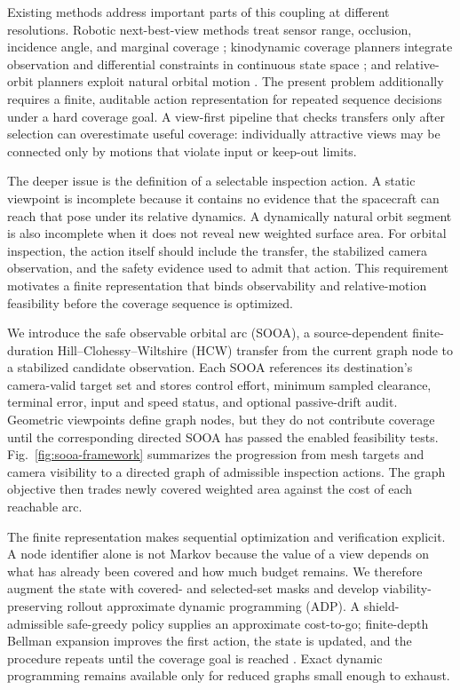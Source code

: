 \documentclass{IEEEtaes}
\theoremstyle{remark}
\theoremstyle{plain}
\begin{document}
Existing methods address important parts of this coupling at different resolutions. Robotic next-best-view methods treat sensor range, occlusion, incidence angle, and marginal coverage \cite{scott2003view}; kinodynamic coverage planners integrate observation and differential constraints in continuous state space \cite{faghihi2022kinodynamic,faghihi2023multiple}; and relative-orbit planners exploit natural orbital motion \cite{hou2024relative,deka2023astrodynamics}. The present problem additionally requires a finite, auditable action representation for repeated sequence decisions under a hard coverage goal. A view-first pipeline that checks transfers only after selection can overestimate useful coverage: individually attractive views may be connected only by motions that violate input or keep-out limits.

The deeper issue is the definition of a selectable inspection action. A static viewpoint is incomplete because it contains no evidence that the spacecraft can reach that pose under its relative dynamics. A dynamically natural orbit segment is also incomplete when it does not reveal new weighted surface area. For orbital inspection, the action itself should include the transfer, the stabilized camera observation, and the safety evidence used to admit that action. This requirement motivates a finite representation that binds observability and relative-motion feasibility before the coverage sequence is optimized.

We introduce the safe observable orbital arc (SOOA), a source-dependent finite-duration Hill--Clohessy--Wiltshire (HCW) transfer from the current graph node to a stabilized candidate observation. Each SOOA references its destination's camera-valid target set and stores control effort, minimum sampled clearance, terminal error, input and speed status, and optional passive-drift audit. Geometric viewpoints define graph nodes, but they do not contribute coverage until the corresponding directed SOOA has passed the enabled feasibility tests. Fig.~\ref{fig:sooa-framework} summarizes the progression from mesh targets and camera visibility to a directed graph of admissible inspection actions. The graph objective then trades newly covered weighted area against the cost of each reachable arc.

The finite representation makes sequential optimization and verification explicit. A node identifier alone is not Markov because the value of a view depends on what has already been covered and how much budget remains. We therefore augment the state with covered- and selected-set masks and develop viability-preserving rollout approximate dynamic programming (ADP). A shield-admissible safe-greedy policy supplies an approximate cost-to-go; finite-depth Bellman expansion improves the first action, the state is updated, and the procedure repeats until the coverage goal is reached \cite{bertsekas2020rollout}. Exact dynamic programming remains available only for reduced graphs small enough to exhaust.
\end{document}
